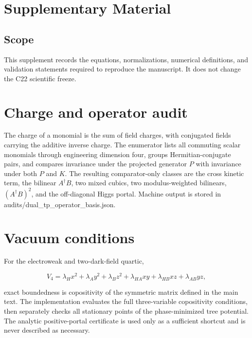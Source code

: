 \documentclass[
]{article}
\author{}
\date{}
\begin{document}
{
\setcounter{tocdepth}{3}
\tableofcontents
}
\hypertarget{supplementary-material}{%
\section{Supplementary Material}\label{supplementary-material}}

\hypertarget{scope}{%
\subsection{Scope}\label{scope}}

This supplement records the equations, normalizations, numerical
definitions, and validation statements required to reproduce the
manuscript. It does not change the C22 scientific freeze.

\hypertarget{charge-and-operator-audit}{%
\section{Charge and operator audit}\label{charge-and-operator-audit}}

The charge of a monomial is the sum of field charges, with conjugated
fields carrying the additive inverse charge. The enumerator lists all
commuting scalar monomials through engineering dimension four, groups
Hermitian-conjugate pairs, and compares invariance under the projected
generator \(P\) with invariance under both \(P\) and \(K\). The
resulting comparator-only classes are the cross kinetic term, the
bilinear \(A^\dagger B\), two mixed cubics, two modulus-weighted
bilinears, \((A^\dagger B)^2\), and the off-diagonal Higgs portal.
Machine output is stored in audits/dual\_tp\_operator\_basis.json.

\hypertarget{vacuum-conditions}{%
\section{Vacuum conditions}\label{vacuum-conditions}}

For the electroweak and two-dark-field quartic,

\[
V_4=\lambda_Hx^2+\lambda_Ay^2+\lambda_Bz^2+
\lambda_{HA}xy+\lambda_{HB}xz+\lambda_{AB}yz,
\]

exact boundedness is copositivity of the symmetric matrix defined in the
main text. The implementation evaluates the full three-variable
copositivity conditions, then separately checks all stationary points of
the phase-minimized tree potential. The analytic positive-portal
certificate is used only as a sufficient shortcut and is never described
as necessary.
\end{document}
